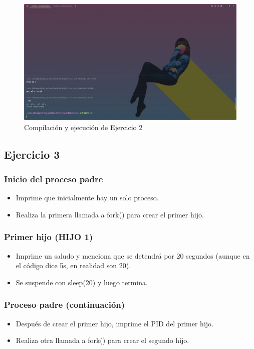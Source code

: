 \documentclass{article}
\newenvironment{code}{\captionsetup{type=listing}}{}
\begin{document}
\begin{code}
	\inputminted{c}{../Ejercicios/e2.c}
\end{code}
\begin{figure}[h]
	\caption{Compilación y ejecución de Ejercicio 2}
	\centering
	\includegraphics[scale=0.3,trim={0 0 20cm 26cm},clip]{ejer-e2.png}
\end{figure}

\newpage
\subsection{Ejercicio 3}
\subsubsection*{Inicio del proceso padre}
    \begin{itemize}
        \item Imprime que inicialmente hay un solo proceso.
        \item Realiza la primera llamada a fork() para crear el primer
		 hijo.
	\end{itemize}
\subsubsection*{Primer hijo (HIJO 1)}
    \begin{itemize}
        \item Imprime un saludo y menciona que se detendrá por 20 
		segundos (aunque en el código dice 5s, en realidad son 20).
        \item Se suspende con sleep(20) y luego termina.
	\end{itemize}
\subsubsection*{Proceso padre (continuación)}
    \begin{itemize}
        \item Después de crear el primer hijo, imprime el PID del 
		primer hijo.
        \item Realiza otra llamada a fork() para crear el segundo hijo.
	\end{itemize}
\end{document}
